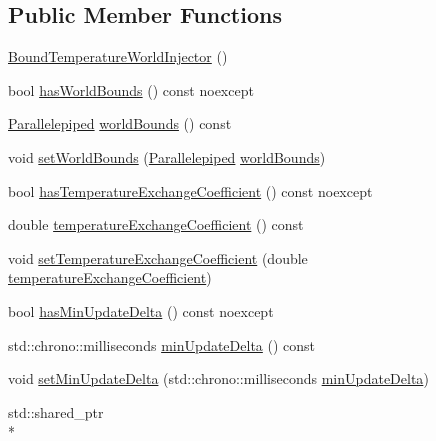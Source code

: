 \subsection*{Public Member Functions}
\begin{DoxyCompactItemize}
\item 
\hyperlink{class_bound_temperature_world_injector_a8c9341a5ced28d934273c3fc265b1bf1}{Bound\-Temperature\-World\-Injector} ()
\item 
bool \hyperlink{class_bound_temperature_world_injector_a71c03ba809495eed2b09318343ded2d2}{has\-World\-Bounds} () const noexcept
\item 
\hyperlink{struct_parallelepiped}{Parallelepiped} \hyperlink{class_bound_temperature_world_injector_a33e6c7646ca32618e8d073fdaba33065}{world\-Bounds} () const 
\item 
void \hyperlink{class_bound_temperature_world_injector_aa3c6c0c782869509238b83774434347c}{set\-World\-Bounds} (\hyperlink{struct_parallelepiped}{Parallelepiped} \hyperlink{class_bound_temperature_world_injector_a33e6c7646ca32618e8d073fdaba33065}{world\-Bounds})
\item 
bool \hyperlink{class_bound_temperature_world_injector_a1274c81082b7ce2ce2bc433d7e93c17b}{has\-Temperature\-Exchange\-Coefficient} () const noexcept
\item 
double \hyperlink{class_bound_temperature_world_injector_a27e7b6a6da5015cadbbe7f21ad503287}{temperature\-Exchange\-Coefficient} () const 
\item 
void \hyperlink{class_bound_temperature_world_injector_a1e71c5d4a8397b9c8f87bccfe5cf5328}{set\-Temperature\-Exchange\-Coefficient} (double \hyperlink{class_bound_temperature_world_injector_a27e7b6a6da5015cadbbe7f21ad503287}{temperature\-Exchange\-Coefficient})
\item 
bool \hyperlink{class_bound_temperature_world_injector_a1a1a9e8c8ee2ef48cffbcdcbc2e947e5}{has\-Min\-Update\-Delta} () const noexcept
\item 
std\-::chrono\-::milliseconds \hyperlink{class_bound_temperature_world_injector_ad064e87615066662fe67ba8b41c44959}{min\-Update\-Delta} () const 
\item 
void \hyperlink{class_bound_temperature_world_injector_a3017672c819fd74e17fb79d69aa7beae}{set\-Min\-Update\-Delta} (std\-::chrono\-::milliseconds \hyperlink{class_bound_temperature_world_injector_ad064e87615066662fe67ba8b41c44959}{min\-Update\-Delta})
\item 
std\-::shared\-\_\-ptr\\*

\end{DoxyCompactItemize}
